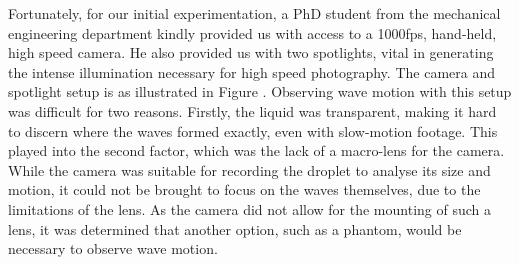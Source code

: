 \todo{[Andrew?]} Fortunately, for our initial experimentation, a PhD student from the mechanical engineering department kindly provided us with access to a 1000fps, hand-held, high speed camera. He also provided us with two spotlights, vital in generating the intense illumination necessary for high speed photography. The camera and spotlight setup is as illustrated in Figure . Observing wave motion with this setup was difficult for two reasons. Firstly, the liquid was transparent, making it hard to discern where the waves formed exactly, even with slow-motion footage. This played into the second factor, which was the lack of a macro-lens for the camera. While the camera was suitable for recording the droplet to analyse its size and motion, it could not be brought to focus on the waves themselves, due to the limitations of the lens. As the camera did not allow for the mounting of such a lens, it was determined that another option, such as a phantom, would be necessary to observe wave motion.  
